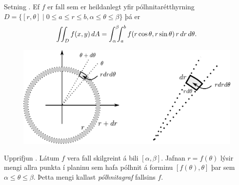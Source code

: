\begin{frame}{} 

\begin {block}{Setning \kaflanr.}
Ef $f$ er fall sem er heildanlegt yfir 
pólhnitarétthyrning
$D=\{[r,\theta]\mid 0\leq a\leq r\leq b, \alpha\leq \theta\leq\beta\}$
þá er 
$$\int\!\!\!\int_D f(x,y)\,dA=\int_\alpha^\beta\!\!\!\int_{a}^{b}
f(r\cos\theta,r\sin\theta)\,r\,dr\, d\theta.$$
\end{block}
\begin {figure}[h!]
 \centering
            \includegraphics[width=0.85\linewidth]{polarelement}
\end {figure}
\end{frame}

\begin{frame}{} 

\begin {block}{Upprifjun \kaflanr.}
Látum $f$ vera fall skilgreint á bili 
$[\alpha,\beta]$.  Jafnan $r=f(\theta)$ lýsir mengi allra punkta í
planinu sem hafa pólhnit á forminu $[f(\theta),\theta]$ þar sem
$\alpha\leq\theta\leq\beta$.  Þetta mengi kallast {\em pólhnitagraf}
fallsins $f$. 

\end{block}

\end{frame}


